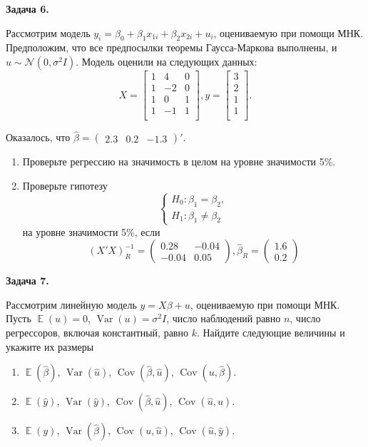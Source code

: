 \documentclass[10pt, a4paper]{extarticle}
\DeclareMathOperator{\cov}{Cov}
\DeclareMathOperator{\Var}{Var}
\DeclareMathOperator{\E}{\mathbb{E}}
\begin{document}
	{\Large \textbf{Задача 6.}}
	
	Рассмотрим модель $y_i = \beta_0 + \beta_1x_{1i} + \beta_2x_{2i} + u_i$, оцениваемую при помощи МНК. Предположим, что все предпосылки теоремы Гаусса-Маркова выполнены, и $u \sim \mathcal{N}(0, \sigma^2I)$. Модель оценили на следующих данных:
	\[
	X = \begin{bmatrix}
		1 & 4 & 0 \\
		1 & -2 & 0 \\
		1 & 0 & 1 \\
		1 & -1 & 1 \\
	\end{bmatrix},
	y = \begin{bmatrix}
		3 \\
		2 \\
		1 \\
		1 \\
	\end{bmatrix}.
	\]
	
	Оказалось, что $\hat{\beta} = \begin{pmatrix}
		2.3 & 0.2 & -1.3
	\end{pmatrix}'$.
	
	\begin{enumerate}[label=\alph*)]
		\item Проверьте регрессию на значимость в целом на уровне значимости 5\%.
		\item Проверьте гипотезу
		\[
		\begin{cases}
			H_0: \beta_1 = \beta_2, \\
			H_1: \beta_1 \ne \beta_2
		\end{cases}
		\]
		на уровне значимости 5\%, если 
		\[
		(X'X)^{-1}_R = \begin{pmatrix}
			0.28 & -0.04 \\
			-0.04 & 0.05
		\end{pmatrix},
		\hat{\beta}_R = \begin{pmatrix}
		1.6 \\
		0.2
	\end{pmatrix}
		\]
	\end{enumerate}
	\vspace{1em}
	
	{\Large \textbf{Задача 7.}}
	
	Рассмотрим линейную модель $y = X\beta + u$, оцениваемую при помощи МНК. Пусть $\E(u) = 0$, $\Var(u) = \sigma^2 I$, число наблюдений равно $n$, число регрессоров, включая константный, равно $k$. Найдите следующие величины и укажите их размеры
	\begin{enumerate}[label=\alph*)]
		\item $\E(\hat{\beta})$, $\Var(\hat{u})$, $\cov(\hat{\beta}, \hat{u})$, $\cov(u, \hat{\beta})$.
		\item $\E(\hat{y})$, $\Var(\hat{y})$, $\cov(\hat{\beta}, \hat{u})$, $\cov(\hat{u}, u)$.
		\item $\E(y)$, $\Var(\hat{\beta})$, $\cov(u, \hat{u})$, $\cov(\hat{u}, \hat{y})$.
	\end{enumerate}
	\vspace{1em}
\end{document}
